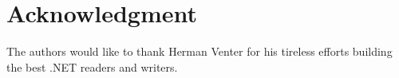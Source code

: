 \documentclass[10pt, conference, compsocconf]{IEEEtran}
\begin{document}


\section*{Acknowledgment}
The authors would like to thank Herman Venter for his tireless efforts
building the best .NET readers and writers.



\balance



%
%
%









\end{document}
